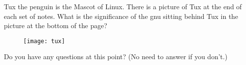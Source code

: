 \documentclass[letterpaper,12pt]{exam}
\begin{document}
\begin{questions}
\question  Tux the penguin is the Mascot of Linux.  There is a picture of Tux at the end of each set of notes.  What is the significance of the gnu sitting behind Tux in the picture at the bottom of the page?
\vspace{1.5cm}


\begin{figure}[b]\label{end}
	\center
	\texttt{[image: tux]}
	{}
\end{figure}
\question Do you have any questions at this point? (No need to answer if you don't.)
\end{questions}
\end{document}
